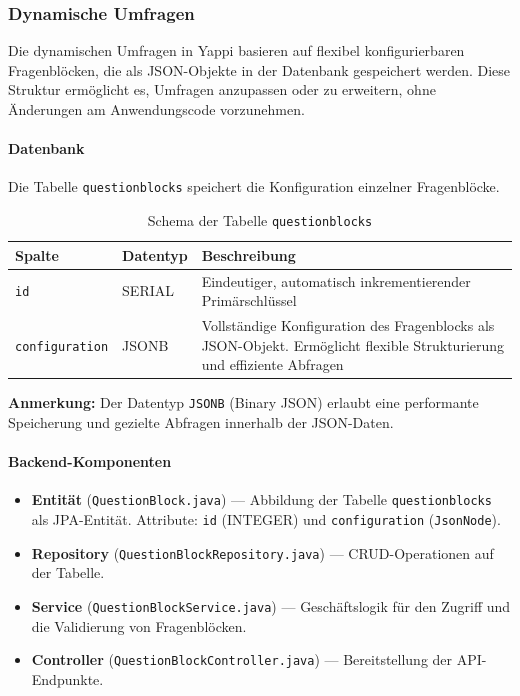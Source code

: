 \documentclass[12pt,a4paper]{report}
\begin{document}
\subsubsection{Dynamische Umfragen}
    Die dynamischen Umfragen in Yappi basieren auf flexibel konfigurierbaren Fragenblöcken, die als JSON-Objekte in der Datenbank gespeichert werden.
    Diese Struktur ermöglicht es, Umfragen anzupassen oder zu erweitern, ohne Änderungen am Anwendungscode vorzunehmen.

\paragraph{Datenbank}
    Die Tabelle \texttt{questionblocks} speichert die Konfiguration einzelner Fragenblöcke.

    \begin{table}[!htbp]
        \centering
        \begin{tabular}{|l|l|p{9cm}|}
            \hline
                \textbf{Spalte} & \textbf{Datentyp} & \textbf{Beschreibung} \\
            \hline
                \texttt{id} & SERIAL & Eindeutiger, automatisch inkrementierender Primärschlüssel \\
                \texttt{configuration} & JSONB & Vollständige Konfiguration des Fragenblocks als JSON-Objekt.
                Ermöglicht flexible Strukturierung und effiziente Abfragen \\
            \hline
        \end{tabular}
        \caption{Schema der Tabelle \texttt{questionblocks}}
        \label{tab:questionblocks_schema}
    \end{table}

    \noindent
    \textbf{Anmerkung:} Der Datentyp \texttt{JSONB} (Binary JSON) erlaubt eine performante Speicherung und gezielte Abfragen innerhalb der JSON-Daten.

\paragraph{Backend-Komponenten}
    \begin{itemize}
        \item \textbf{Entität} (\texttt{QuestionBlock.java}) — Abbildung der Tabelle \texttt{questionblocks} als JPA-Entität.
            Attribute: \texttt{id} (INTEGER) und \texttt{configuration} (\texttt{JsonNode}).
        \item \textbf{Repository} (\texttt{QuestionBlockRepository.java}) — CRUD-Operationen auf der Tabelle.
        \item \textbf{Service} (\texttt{QuestionBlockService.java}) — Geschäftslogik für den Zugriff und die Validierung von Fragenblöcken.
        \item \textbf{Controller} (\texttt{QuestionBlockController.java}) — Bereitstellung der API-Endpunkte.
    \end{itemize}
\end{document}
